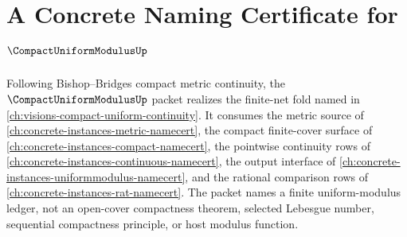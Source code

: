 \chapter{A Concrete Naming Certificate for $\CompactUniformModulusUp$}
\label{ch:concrete-instances-compact-uniform-modulus-namecert}

Following Bishop--Bridges compact metric continuity, the $\CompactUniformModulusUp$ packet realizes the finite-net fold named in \autoref{ch:visions-compact-uniform-continuity}. It consumes the metric source of \autoref{ch:concrete-instances-metric-namecert}, the compact finite-cover surface of \autoref{ch:concrete-instances-compact-namecert}, the pointwise continuity rows of \autoref{ch:concrete-instances-continuous-namecert}, the output interface of \autoref{ch:concrete-instances-uniformmodulus-namecert}, and the rational comparison rows of \autoref{ch:concrete-instances-rat-namecert}. The packet names a finite uniform-modulus ledger, not an open-cover compactness theorem, selected Lebesgue number, sequential compactness principle, or host modulus function.

